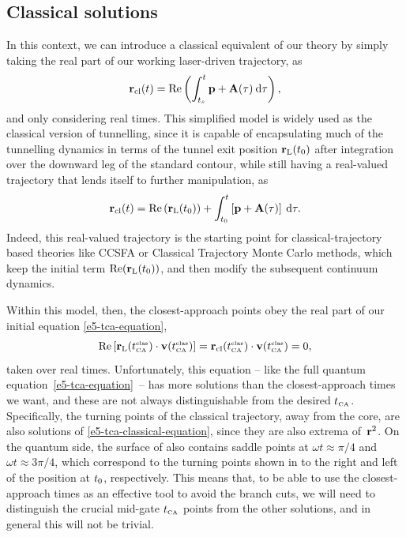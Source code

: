 \subsection{Classical solutions}
\label{sec:classical-tcas}

In this context, we can introduce a classical equivalent of our theory by simply taking the real part of our working laser-driven trajectory, as
\begin{equation}
\vb{r}_{\mathrm{cl}}(t) = \Re\left(\int_{{t_s}}^{t} \vb{p}+\vb{A}(\tau) \: \mathrm{d}\tau\right)
,
\label{e5-classical-trajectory}
\end{equation}
and only considering real times. This simplified model is widely used as the classical version of tunnelling, since it is capable of encapsulating much of the tunnelling dynamics in terms of the tunnel exit position $\vb{r}_\mathrm{L}({t_0})$ after integration over the downward leg of the standard contour, while still having a real-valued trajectory that lends itself to further manipulation, as
\begin{equation}
\vb{r}_{\mathrm{cl}}(t) =  \Re\left(\vb{r}_\mathrm{L}({t_0})\right) + \int_{{t_0}}^{t} \left[ \vb{p}+\vb{A}(\tau) \right] \: \mathrm{d}\tau
.
\label{e5-explicit-classical-trajectory}
\end{equation}
Indeed, this real-valued trajectory is the starting point for classical-trajectory based theories like CCSFA or Classical Trajectory Monte Carlo methods, which keep the initial term $\Re(\vb{r}_\mathrm{L}({t_0}))$, and then modify the subsequent continuum dynamics.

Within this model, then, the closest-approach points obey the real part of our initial equation \eqref{e5-tca-equation}, 
\begin{equation}
\Re\left[\vb{r}_\mathrm{L}({t_{\scriptscriptstyle\mathrm{CA}}^{\scriptscriptstyle \mathrm{clas}}})\cdot\vb{v}({t_{\scriptscriptstyle\mathrm{CA}}^{\scriptscriptstyle \mathrm{clas}}})\right]
=
\vb{r}_{\mathrm{cl}}({t_{\scriptscriptstyle\mathrm{CA}}^{\scriptscriptstyle \mathrm{clas}}})\cdot\vb{v}({t_{\scriptscriptstyle\mathrm{CA}}^{\scriptscriptstyle \mathrm{clas}}})=0
,
\label{e5-tca-classical-equation}
\end{equation}
taken over real times. Unfortunately, this equation -- like the full quantum equation~\eqref{e5-tca-equation}~-- has more solutions than the closest-approach times we want, and these are not always distinguishable from the desired ${t_{\scriptscriptstyle\mathrm{CA}}}$. Specifically, the turning points of the classical trajectory, away from the core, are also solutions of \eqref{e5-tca-classical-equation}, since they are also extrema of~$\vb{r}^2$. On the quantum side, the surface of  also contains saddle points at $\omega t\approx \pi/4$ and $\omega t \approx 3\pi/4$, which correspond to the turning points shown in  to the right and left of the position at ${t_0}$, respectively.  This means that, to be able to use the closest-approach times as an effective tool to avoid the branch cuts, we will need to distinguish the crucial mid-gate ${t_{\scriptscriptstyle\mathrm{CA}}}$ points from the other solutions, and in general this will not be trivial.

